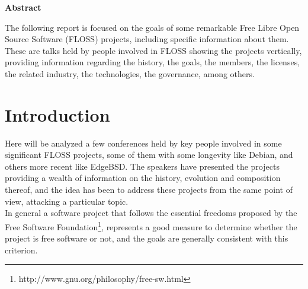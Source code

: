 \documentclass[11pt]{article} %
\begin{document}

\thispagestyle{empty}
{\bf \huge Abstract}

\vspace{10 mm}

The following report is focused on the goals of some remarkable Free Libre Open Source Software (FLOSS) projects, including specific information about them. These are talks held by people involved in FLOSS showing the projects vertically, providing information regarding the history, the goals, the members, the licenses, the related industry, the technologies, the governance, among others.

\newpage


\tableofcontents %

\newpage



\section{Introduction}

Here will be analyzed a few conferences held by key people involved in some significant FLOSS projects, some of them with some longevity like Debian, and others more recent like EdgeBSD. The speakers have presented the projects providing a wealth of information on the history, evolution and composition thereof, and the idea has been to address these projects from the same point of view, attacking a particular topic.\\

In general a software project that follows the essential freedoms proposed by the Free Software Foundation\footnote{http://www.gnu.org/philosophy/free-sw.html}, represents a good measure to determine whether the project is free software or not, and the goals are generally consistent with this criterion.\\
\end{document}
